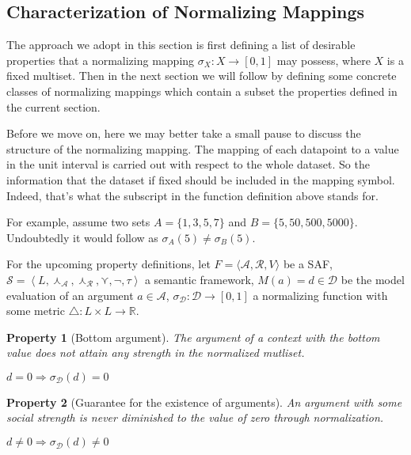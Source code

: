 \documentclass{article}
\newtheorem{property}{Property}
\newcommand{\real}{\mathbb{R}}  %
\newcommand{\args}{\mathcal{A}} %
\newcommand{\att}{\mathcal{R}}  %
\newcommand{\valueset}{L}
\newcommand{\safid}{F}               %
\newcommand{\saf}{\safid = \safbody} %
\newcommand{\safbody}{\langle \args, \att, V \rangle} %
\newcommand{\sembodyNew}{\left\langle \valueset,\SAFand_\mathcal{A}, \SAFand_\mathcal{R},\SAFor,\lnot,\tau \right\rangle} %
\newcommand{\SAFand}{\curlywedge}     %
\newcommand{\SAFor}{\curlyvee}        %
\newcommand{\sem}{\mathcal{S}}
\newcommand{\dataset}{\mathcal{D}}   %
\begin{document}
\subsection{Characterization of Normalizing Mappings}

The approach we adopt in this section is first defining a list of desirable properties that a normalizing mapping $\sigma_X: X  \rightarrow  [0,1]$ may possess, where $X$ is a fixed multiset.  
Then in the next section we will follow by defining some concrete classes of normalizing mappings which contain a subset the properties defined in the current section.

Before we move on, here we may better take a small pause to discuss the structure of the normalizing mapping. The mapping of each datapoint to a value in the unit interval is carried out with respect to the whole dataset. So the information that the dataset if fixed should be included in the mapping symbol. Indeed, that's what the subscript in the function definition above stands for. 

For example, assume two sets $A = \{1, 3 ,5, 7\}$ and $B = \{5, 50, 500, 5000\}$. Undoubtedly it would follow as $\sigma_A(5) \neq \sigma_B(5)$.


\vspace{3mm}
For the upcoming property definitions, let $\saf$ be a SAF, $\sem = \sembodyNew$ a semantic framework,  $M(a) = d \in \dataset$ be the model evaluation of an argument $a \in \args$, $\sigma_{\dataset}: \dataset  \rightarrow  [0,1]$ a normalizing function with some metric  $\bigtriangleup: \valueset \times \valueset \rightarrow \real$.

\begin{property}  [Bottom argument] The argument of a context with the bottom value does not attain any strength in the normalized mutliset.
\begin{center}
$d = 0 \Rightarrow \sigma_{\dataset}(d) = 0$	%
\end{center}
\end{property}

\begin{property}  [Guarantee for the existence of arguments] An argument with some social strength is never diminished to the value of zero through normalization.
\begin{center}
$d \neq 0 \Rightarrow \sigma_{\dataset}(d) \neq 0$
\end{center}
\end{property}
\end{document}

